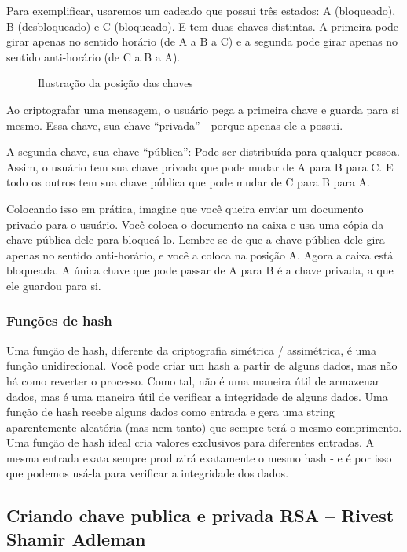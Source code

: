 Para exemplificar, usaremos um cadeado que possui três estados: A (bloqueado), B (desbloqueado) e C (bloqueado). E tem duas chaves distintas. A primeira pode girar apenas no sentido horário (de A a B a C) e a segunda pode girar apenas no sentido anti-horário (de C a B a A).

\vspace{1cm}
\begin{figure}[H] \centering 
  \caption{\label{fig:5} Ilustração da posição das chaves} 
\end{figure}

Ao criptografar uma mensagem, o usuário pega a primeira chave e guarda para si mesmo. Essa chave, sua chave ``privada'' - porque apenas ele a possui.

A segunda chave, sua chave ``pública'': Pode ser distribuída para qualquer pessoa. Assim, o usuário tem sua chave privada que pode mudar de A para B para C. E todo os outros tem sua chave pública que pode mudar de C para B para A.

Colocando isso em prática, imagine que você queira enviar um documento privado para o usuário. Você coloca o documento na caixa e usa uma cópia da chave pública dele para bloqueá-lo. Lembre-se de que a chave pública dele gira apenas no sentido anti-horário, e você a coloca na posição A. Agora a caixa está bloqueada. A única chave que pode passar de A para B é a chave privada, a que ele guardou para si.

\subsubsection{Funções de hash}
Uma função de hash, diferente da criptografia simétrica / assimétrica, é uma função unidirecional. Você pode criar um hash a partir de alguns dados, mas não há como reverter o processo. Como tal, não é uma maneira útil de armazenar dados, mas é uma maneira útil de verificar a integridade de alguns dados.
Uma função de hash recebe alguns dados como entrada e gera uma string aparentemente aleatória (mas nem tanto) que sempre terá o mesmo comprimento. Uma função de hash ideal cria valores exclusivos para diferentes entradas. A mesma entrada exata sempre produzirá exatamente o mesmo hash - e é por isso que podemos usá-la para verificar a integridade dos dados.

\subsection{Criando chave publica e privada RSA – Rivest Shamir Adleman}

